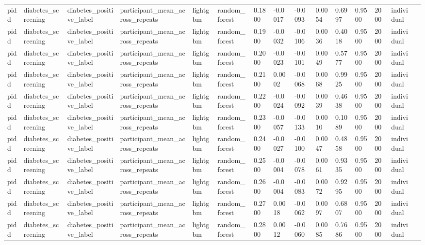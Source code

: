 \begin{tabular}{lllllllllllllll}
pidd & diabetes\_screening & diabetes\_positive\_label & participant\_mean\_across\_repeats & lightgbm & random\_forest & 0.1800 & -0.0017 & -0.0093 & 0.0054 & 0.6997 & 0.9500 & 2000 & individual &  \\
pidd & diabetes\_screening & diabetes\_positive\_label & participant\_mean\_across\_repeats & lightgbm & random\_forest & 0.1900 & -0.0032 & -0.0106 & 0.0036 & 0.4018 & 0.9500 & 2000 & individual &  \\
pidd & diabetes\_screening & diabetes\_positive\_label & participant\_mean\_across\_repeats & lightgbm & random\_forest & 0.2000 & -0.0023 & -0.0101 & 0.0049 & 0.5777 & 0.9500 & 2000 & individual &  \\
pidd & diabetes\_screening & diabetes\_positive\_label & participant\_mean\_across\_repeats & lightgbm & random\_forest & 0.2100 & 0.0002 & -0.0068 & 0.0068 & 0.9925 & 0.9500 & 2000 & individual &  \\
pidd & diabetes\_screening & diabetes\_positive\_label & participant\_mean\_across\_repeats & lightgbm & random\_forest & 0.2200 & -0.0024 & -0.0092 & 0.0039 & 0.4638 & 0.9500 & 2000 & individual &  \\
pidd & diabetes\_screening & diabetes\_positive\_label & participant\_mean\_across\_repeats & lightgbm & random\_forest & 0.2300 & -0.0057 & -0.0133 & 0.0010 & 0.1089 & 0.9500 & 2000 & individual &  \\
pidd & diabetes\_screening & diabetes\_positive\_label & participant\_mean\_across\_repeats & lightgbm & random\_forest & 0.2400 & -0.0027 & -0.0100 & 0.0047 & 0.4858 & 0.9500 & 2000 & individual &  \\
pidd & diabetes\_screening & diabetes\_positive\_label & participant\_mean\_across\_repeats & lightgbm & random\_forest & 0.2500 & -0.0004 & -0.0078 & 0.0061 & 0.9335 & 0.9500 & 2000 & individual &  \\
pidd & diabetes\_screening & diabetes\_positive\_label & participant\_mean\_across\_repeats & lightgbm & random\_forest & 0.2600 & -0.0004 & -0.0083 & 0.0072 & 0.9295 & 0.9500 & 2000 & individual &  \\
pidd & diabetes\_screening & diabetes\_positive\_label & participant\_mean\_across\_repeats & lightgbm & random\_forest & 0.2700 & 0.0018 & -0.0062 & 0.0097 & 0.6807 & 0.9500 & 2000 & individual &  \\
pidd & diabetes\_screening & diabetes\_positive\_label & participant\_mean\_across\_repeats & lightgbm & random\_forest & 0.2800 & 0.0012 & -0.0060 & 0.0085 & 0.7686 & 0.9500 & 2000 & individual &  \\

\end{tabular}

